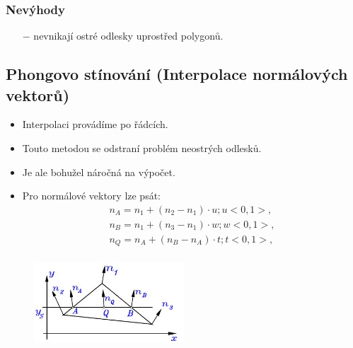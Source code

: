 		\subsubsection*{Nevýhody}
			\begin{itemize}
				\item[$-$] nevnikají ostré odlesky uprostřed polygonů.
			\end{itemize}
\subsection{Phongovo stínování (Interpolace normálových vektorů)}
\begin{itemize}
	\item Interpolaci provádíme po řádcích.
	\item Touto metodou se odstraní problém neostrých odlesků.
	\item Je ale bohužel náročná na výpočet.
	\item Pro normálové vektory lze psát:
		\begin{equation*} 
		\begin{array}{c}
			n_A = n_1 + (n_2 - n_1) \cdot u; u <0, 1>, \\
			n_B = n_1 + (n_3 - n_1) \cdot w; w <0, 1>, \\
			n_Q = n_A + (n_B - n_A) \cdot t; t <0, 1>, \\
		\end{array}
		\end{equation*}
\end{itemize}
		\begin{figure}[H]
		\centering
		\includegraphics[width=0.5\textwidth]{assets/5_phong_stin}
		\end{figure}
